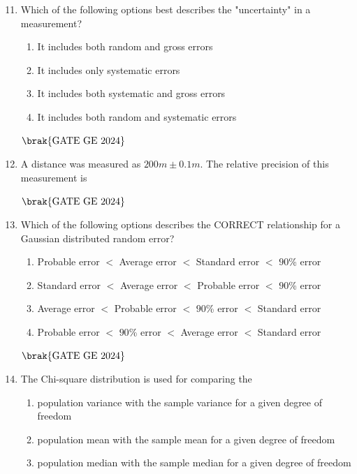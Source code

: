 \documentclass[journal,12pt,onecolumn]{IEEEtran}
\theoremstyle{remark}
\begin{document}
\begin{enumerate}
\setcounter{enumi}{10}
\item Which of the following options best describes the "uncertainty" in a measurement?
\begin{enumerate}
\item It includes both random and gross errors
\item It includes only systematic errors
\item It includes both systematic and gross errors
\item It includes both random and systematic errors
\end{enumerate}
\hfill $\brak{\text{GATE GE 2024}}$
\bigskip

\item A distance was measured as $200 m \pm 0.1 m$.
The relative precision of this measurement is
\begin{enumerate}
\end{enumerate}
\hfill $\brak{\text{GATE GE 2024}}$
\bigskip
\item Which of the following options describes the CORRECT relationship for a Gaussian distributed random error?
\begin{enumerate}
\item Probable error $<$ Average error $<$ Standard error $<$ $90$\% error
\item Standard error $<$ Average error $<$ Probable error $<$ $90$\% error
\item Average error $<$ Probable error $<$ $90$\% error $<$ Standard error
\item Probable error $<$ $90$\% error $<$ Average error $<$ Standard error
\end{enumerate}
\hfill $\brak{\text{GATE GE 2024}}$
\bigskip
\item The Chi-square distribution is used for comparing the
\begin{enumerate}
\item population variance with the sample variance for a given degree of freedom
\item population mean with the sample mean for a given degree of freedom
\item population median with the sample median for a given degree of freedom

\end{enumerate}
\end{enumerate}
\end{document}
